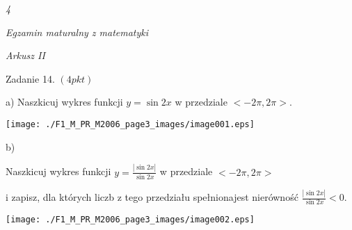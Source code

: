 \documentclass[a4paper,12pt]{article}
\begin{document}
{\it 4}

{\it Egzamin maturalny z matematyki}

{\it Arkusz II}

Zadanie 14. $(4pkt)$

a) Naszkicuj wykres funkcji $y=\sin 2x$ w przedziale $<-2\pi,2\pi>.$
\begin{center}
\texttt{[image: ./F1\_M\_PR\_M2006\_page3\_images/image001.eps]}
\end{center}
b)

Naszkicuj wykres funkcji $y=\displaystyle \frac{|\sin 2x|}{\sin 2x}$ w przedziale $<-2\pi,2\pi>$

i zapisz, dla których liczb z tego przedziału spełnionajest nierówność $\displaystyle \frac{|\sin 2x|}{\sin 2x}<0.$
\begin{center}
\texttt{[image: ./F1\_M\_PR\_M2006\_page3\_images/image002.eps]}
\end{center}
\end{document}
